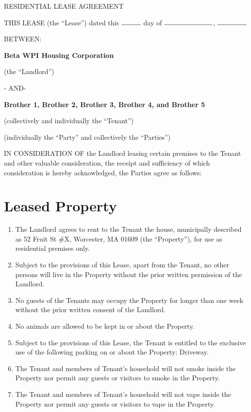 \documentclass[12pt]{article}
\begin{document}
\begin{center}
RESIDENTIAL LEASE AGREEMENT
\end{center}

THIS LEASE (the ``Lease'') dated this $\rule{1cm}{0.15mm}$ day of
$\rule{2.5cm}{0.15mm}$, $\rule{1.5cm}{0.15mm}$

BETWEEN:

\begin{center}
\textbf{Beta WPI Housing Corporation}

(the ``Landlord'')

- AND-

\textbf{Brother 1, Brother 2, Brother 3, Brother 4, and Brother 5}

(collectively and individually the ``Tenant'')

(individually the ``Party'' and collectively the ``Parties'')
\end{center}

IN CONSIDERATION OF the Landlord leasing certain premises to the Tenant and
other valuable consideration, the receipt and sufficiency of which
consideration is hereby acknowledged, the Parties agree as follows:

\section*{Leased Property}

\begin{enumerate}

    \item The Landlord agrees to rent to the Tenant the house, municipally
	    described as 52 Fruit St \#X, Worcester, MA 01609 (the ``Property''),
		for use as residential premises only.  
    \item Subject to the provisions of this Lease, apart from the Tenant, no
	    other persons will live in the Property without the prior written
		permission of the Landlord.
    \item No guests of the Tenants may occupy the Property for longer than one
	    week without the prior written consent of the Landlord.
    \item No animals are allowed to be kept in or about the Property.
    \item Subject to the provisions of this Lease, the Tenant is entitled to
	    the exclusive use of the following parking on or about the
		Property: Driveway.
    \item The Tenant and members of Tenant's household will not smoke inside
	    the Property nor permit any guests or visitors to smoke in the
		Property.
    \item The Tenant and members of Tenant's household will not vape inside the
	    Property nor permit any guests or visitors to vape in the Property.

\end{enumerate}
    
\end{document}
